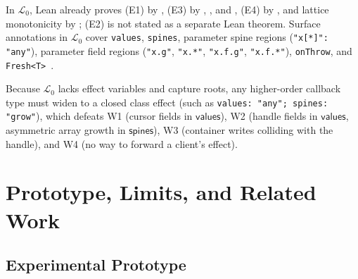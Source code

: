 \documentclass[10pt,a4paper]{article}
\theoremstyle{definition}
\newcommand{\kw}[1]{\mathsf{#1}}
\newcommand{\val}{\kw{values}}
\newcommand{\st}{\kw{spines}}
\newcommand{\code}[1]{\textcolor{codec}{\texttt{#1}}}
\newcommand{\Lang}{\mathcal{L}}
\begin{document}
\noindent
In $\Lang_0$, Lean already proves (E1) by , (E3) by
, , and
, (E4) by
, and lattice monotonicity by
; (E2) is not stated as a separate Lean theorem.
Surface annotations in $\Lang_0$ cover \code{values}, \code{spines},
parameter spine regions (\code{"x[*]": "any"}), parameter field regions
(\code{"x.g"}, \code{"x.*"}, \code{"x.f.g"}, \code{"x.f.*"}),
\code{onThrow}, and \code{Fresh<T>}~\cite{ann}.

Because $\Lang_0$ lacks effect variables and capture roots, any
higher-order callback type must widen to a closed class effect (such as
\code{values: "any"; spines: "grow"}), which defeats W1 (cursor fields
in $\val$), W2 (handle fields in $\val$, asymmetric array growth in
$\st$), W3 (container writes colliding with the handle), and W4 (no way
to forward a client's effect).

\section{Prototype, Limits, and Related Work}\label{sec:status}

\subsection{Experimental Prototype}
\end{document}
